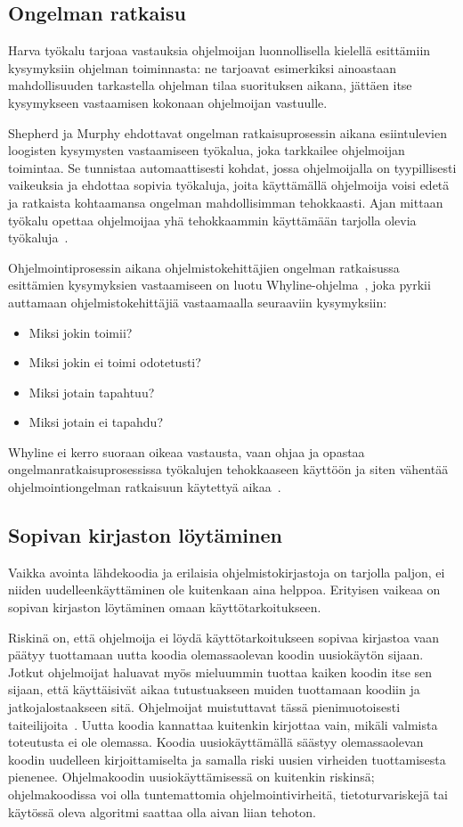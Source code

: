 \documentclass[finnish]{tktltiki2}
\theoremstyle{definition}
\theoremstyle{remark}
\begin{document}
\subsection{Ongelman ratkaisu}
Harva työkalu tarjoaa vastauksia ohjelmoijan luonnollisella kielellä esittämiin kysymyksiin ohjelman toiminnasta: ne tarjoavat esimerkiksi ainoastaan mahdollisuuden tarkastella ohjelman tilaa suorituksen aikana, jättäen itse kysymykseen vastaamisen kokonaan ohjelmoijan vastuulle.

Shepherd ja Murphy ehdottavat ongelman ratkaisuprosessin aikana esiintulevien loogisten kysymysten vastaamiseen työkalua, joka tarkkailee ohjelmoijan toimintaa. Se tunnistaa automaattisesti kohdat, jossa ohjelmoijalla on tyypillisesti vaikeuksia ja ehdottaa sopivia työkaluja, joita käyttämällä ohjelmoija voisi edetä ja ratkaista kohtaamansa ongelman mahdollisimman tehokkaasti. Ajan mittaan työkalu opettaa ohjelmoijaa yhä tehokkaammin käyttämään tarjolla olevia työkaluja~\cite{programmers-coach}.

Ohjelmointiprosessin aikana ohjelmistokehittäjien ongelman ratkaisussa esittämien
kysymyksien vastaamiseen on luotu Whyline-ohjelma~\cite{whyline}, joka
pyrkii auttamaan ohjelmistokehittäjiä vastaamaalla seuraaviin kysymyksiin:

\begin{itemize}
  \item Miksi jokin toimii?
  \item Miksi jokin ei toimi odotetusti?
  \item Miksi jotain tapahtuu?
  \item Miksi jotain ei tapahdu?
\end{itemize}
Whyline ei kerro suoraan oikeaa vastausta, vaan ohjaa ja opastaa ongelmanratkaisuprosessissa työkalujen tehokkaaseen käyttöön ja siten vähentää ohjelmointiongelman ratkaisuun käytettyä aikaa~\cite{whyline}.

\subsection{Sopivan kirjaston löytäminen}
\label{ch:jungloid}
Vaikka avointa lähdekoodia ja erilaisia ohjelmistokirjastoja on tarjolla paljon, ei niiden uudelleenkäyttäminen ole kuitenkaan aina helppoa. Erityisen vaikeaa on sopivan kirjaston löytäminen omaan käyttötarkoitukseen.

Riskinä on, että ohjelmoija ei löydä käyttötarkoitukseen sopivaa kirjastoa vaan päätyy tuottamaan uutta koodia olemassaolevan koodin uusiokäytön sijaan. Jotkut ohjelmoijat haluavat myös mieluummin tuottaa kaiken koodin itse sen sijaan, että käyttäisivät aikaa tutustuakseen muiden tuottamaan koodiin ja jatkojalostaakseen sitä. Ohjelmoijat muistuttavat tässä pienimuotoisesti taiteilijoita~\cite{hackers-and-painters}.
Uutta koodia kannattaa kuitenkin kirjottaa vain, mikäli valmista toteutusta ei ole olemassa. Koodia uusiokäyttämällä säästyy olemassaolevan koodin uudelleen kirjoittamiselta ja samalla riski uusien virheiden tuottamisesta pienenee. Ohjelmakoodin uusiokäyttämisessä on kuitenkin riskinsä; ohjelmakoodissa voi olla tuntemattomia ohjelmointivirheitä, tietoturvariskejä tai käytössä oleva algoritmi saattaa olla aivan liian tehoton.
\end{document}
